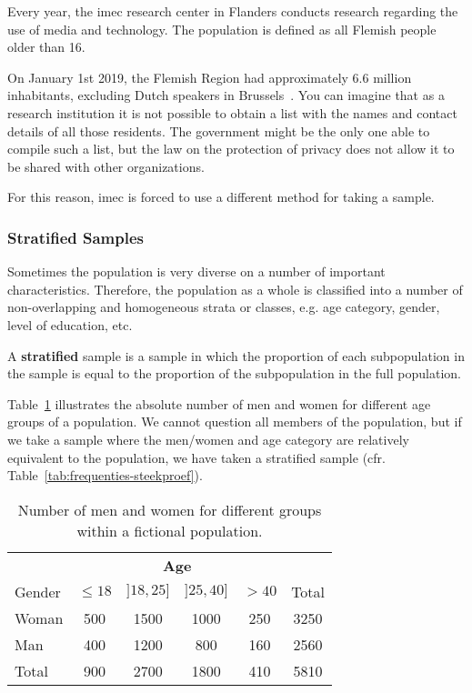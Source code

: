 \begin{example}
    Every year, the imec research center in Flanders conducts research regarding the use of media and technology. The population is defined as all Flemish people older than 16. 
    
    On January 1st 2019, the Flemish Region had approximately 6.6 million inhabitants, excluding Dutch speakers in Brussels~\autocite{Statbel2019}. You can imagine that as a research institution it is not possible to obtain a list with the names and contact details of all those residents. The government might be the only one able to compile such a list, but the law on the protection of privacy does not allow it to be shared with other organizations.
    
    For this reason, imec is forced to use a different method for taking a sample.
\end{example}

\subsubsection{Stratified Samples}

Sometimes the population is very diverse on a number of important characteristics. Therefore, the population as a whole is classified into a number of non-overlapping and homogeneous strata or classes, e.g. age category, gender, level of education, etc.

\begin{definition}
    A \textbf{stratified} sample is a sample in which the proportion of each subpopulation in the sample is equal to the proportion of the subpopulation in the full population.
\end{definition}

\begin{example}
    Table~\ref{tab:frequenties-populatie} illustrates the absolute number of men and women for different age groups of a population.
    We cannot question all members of the population, but if we take a sample where the men/women and age category are relatively equivalent to the population, we have taken a stratified sample (cfr. Table~\ref{tab:frequenties-steekproef}).
\end{example}

\begin{table}
    \centering
    \begin{tabular}{l|cccc|c}
        & \multicolumn{4}{c|}{\textbf{Age}} & \\
        Gender & $\le 18$ & $]18,25]$ & $]25, 40]$ & $> 40$ & Total\\
        \hline
        Woman & 500 & 1500 & 1000 & 250 & 3250 \\
        Man   & 400 & 1200 & 800 & 160 & 2560\\
        \hline
        Total & 900 & 2700 & 1800 & 410 & 5810
    \end{tabular}
    \caption{Number of men and women for different groups within a fictional population.}
    \label{tab:frequenties-populatie}
\end{table}

